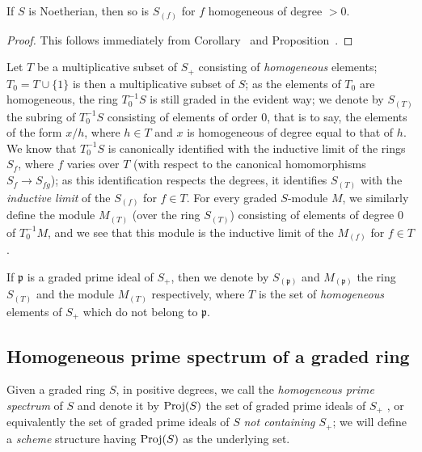 \begin{corollary}[2.2.6]
\label{II.2.2.6}
If $S$ is Noetherian, then so is $S_{(f)}$ for $f$ homogeneous of degree $>0$.
\end{corollary}

\begin{proof}
This follows immediately from Corollary~ and Proposition~.
\end{proof}

\begin{env}[2.2.7]
\label{II.2.2.7}
Let $T$ be a multiplicative subset of $S_+$ consisting of \emph{homogeneous} elements;
$T_0=T\cup\{1\}$ is then a multiplicative subset of $S$;
as the elements of $T_0$ are homogeneous, the ring $T_0^{-1}S$ is still graded in the evident way;
we denote by $S_{(T)}$ the subring of $T_0^{-1}S$ consisting of elements of order $0$, that is to say, the elements of the form $x/h$, where $h\in T$ and $x$ is homogeneous of degree equal to that of $h$.
We know  that $T_0^{-1}S$ is canonically identified with the inductive limit of the rings $S_f$, where $f$ varies over $T$ (with respect to the canonical homomorphisms $S_f\to S_{fg}$);
as this identification respects the degrees, it identifies $S_{(T)}$ with the \emph{inductive limit} of the $S_{(f)}$ for $f\in T$.
For every graded $S$-module $M$, we similarly define the module $M_{(T)}$ (over the ring $S_{(T)}$) consisting of elements of degree $0$ of $T_0^{-1}M$, and we see that this module is the inductive limit of the $M_{(f)}$ for $f\in T$.

If $\mathfrak{p}$ is a graded prime ideal of $S_+$, then we denote by $S_{(\mathfrak{p})}$ and $M_{(\mathfrak{p})}$ the ring $S_{(T)}$ and the module $M_{(T)}$ respectively, where $T$ is the set of \emph{homogeneous} elements of $S_+$ which do not belong to $\mathfrak{p}$.\end{env}


\subsection{Homogeneous prime spectrum of a graded ring}
\label{subsection:II.2.3}

\begin{env}[2.3.1]
\label{II.2.3.1}
Given a graded ring $S$, in positive degrees, we call the \emph{homogeneous prime spectrum} of $S$ and denote it by $\operatorname{Proj}(S)$ the set of graded prime ideals of $S_+$ , or equivalently the set of graded prime ideals of $S$ \emph{not containing $S_+$};
we will define a \emph{scheme} structure having $\operatorname{Proj}(S)$ as the underlying set.
\end{env}

